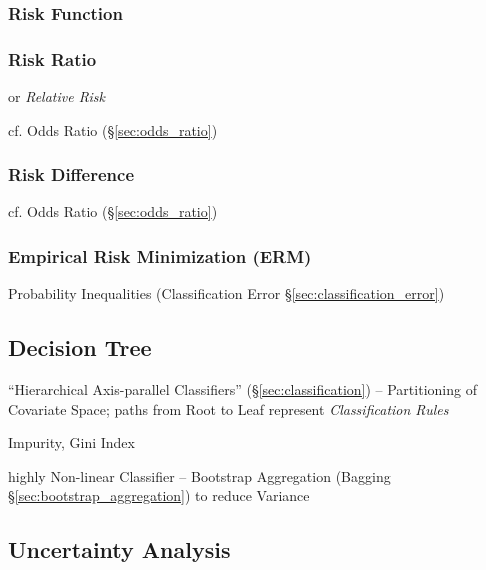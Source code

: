 \subsubsection{Risk Function}\label{sec:risk_function}

\subsubsection{Risk Ratio}\label{sec:risk_ratio}

or \emph{Relative Risk}

cf. Odds Ratio (\S\ref{sec:odds_ratio})



\subsubsection{Risk Difference}\label{sec:risk_difference}

cf. Odds Ratio (\S\ref{sec:odds_ratio})



\subsubsection{Empirical Risk Minimization (ERM)}\label{sec:erm}

Probability Inequalities (Classification Error \S\ref{sec:classification_error})





\subsection{Decision Tree}\label{sec:decision_tree}

``Hierarchical Axis-parallel Classifiers'' (\S\ref{sec:classification}) --
Partitioning of Covariate Space; paths from Root to Leaf represent
\emph{Classification Rules}

Impurity, Gini Index

highly Non-linear Classifier --
Bootstrap Aggregation (Bagging \S\ref{sec:bootstrap_aggregation}) to reduce
Variance



\subsection{Uncertainty Analysis}\label{sec:uncertainty_analysis}

